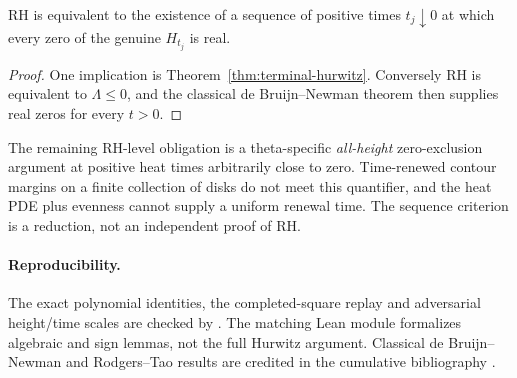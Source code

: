 \begin{proposition}
\label{prop:sequence-heattimes}
RH is equivalent to the existence of
a sequence of positive times $t_j\downarrow0$
at which every zero of the genuine $H_{t_j}$
is real.
\end{proposition}
\begin{proof}
One implication is Theorem~\ref{thm:terminal-hurwitz}.
Conversely RH is equivalent to $\Lambda\le0$,
and the classical de Bruijn--Newman theorem
then supplies real zeros for every $t>0$.
\end{proof}

The remaining RH-level obligation is a
theta-specific \emph{all-height} zero-exclusion
argument at positive heat times arbitrarily
close to zero. Time-renewed contour margins
on a finite collection of disks do not
meet this quantifier, and the heat PDE plus
evenness cannot supply a uniform renewal time.
The sequence criterion is a reduction, not
an independent proof of RH.

\paragraph{Reproducibility.}
The exact polynomial identities, the
completed-square replay and adversarial
height/time scales are checked by
.
The matching Lean module
formalizes algebraic and sign lemmas, not
the full Hurwitz argument. Classical
de Bruijn--Newman and Rodgers--Tao results
are credited in the cumulative bibliography
\cite{RodgersTao,NewmanWu}.
